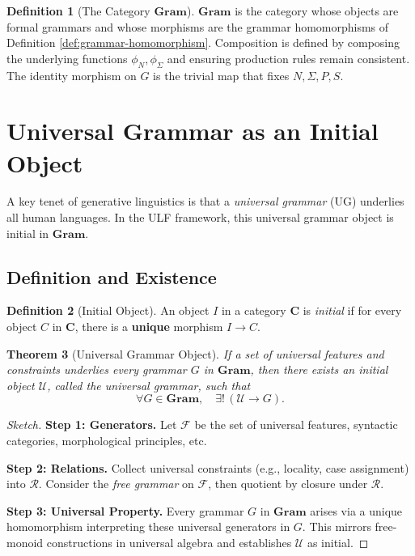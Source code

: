 \documentclass[12pt]{article}
\theoremstyle{plain}
\newtheorem{theorem}{Theorem}[section]
\theoremstyle{definition}
\newtheorem{definition}[theorem]{Definition}
\begin{document}
\begin{definition}[The Category \(\mathbf{Gram}\)]
\(\mathbf{Gram}\) is the category whose objects are formal grammars and whose morphisms are the grammar homomorphisms of Definition \ref{def:grammar-homomorphism}. Composition is defined by composing the underlying functions \(\phi_N, \phi_\Sigma\) and ensuring production rules remain consistent. The identity morphism on \(G\) is the trivial map that fixes \(N, \Sigma, P, S\).
\end{definition}

\section{Universal Grammar as an Initial Object}
A key tenet of generative linguistics is that a \emph{universal grammar} (UG) underlies all human languages. In the ULF framework, this universal grammar object is initial in \(\mathbf{Gram}\).

\subsection{Definition and Existence}
\begin{definition}[Initial Object]
An object \(I\) in a category \(\mathbf{C}\) is \emph{initial} if for every object \(C\) in \(\mathbf{C}\), there is a \textbf{unique} morphism \(I \to C\).
\end{definition}

\begin{theorem}[Universal Grammar Object]\label{thm:UG}
If a set of universal features and constraints underlies every grammar \(G\) in \(\mathbf{Gram}\), then there exists an \emph{initial object} \(\mathcal{U}\), called the \emph{universal grammar}, such that
\[
\forall G \in \mathbf{Gram}, \quad \exists!\, (\mathcal{U} \to G).
\]
\end{theorem}

\begin{proof}[Sketch]
\textbf{Step 1: Generators.}  
Let \(\mathcal{F}\) be the set of universal features, syntactic categories, morphological principles, etc.

\textbf{Step 2: Relations.}  
Collect universal constraints (e.g., locality, case assignment) into \(\mathcal{R}\). Consider the \emph{free grammar} on \(\mathcal{F}\), then quotient by closure under \(\mathcal{R}\).

\textbf{Step 3: Universal Property.}  
Every grammar \(G\) in \(\mathbf{Gram}\) arises via a unique homomorphism interpreting these universal generators in \(G\). This mirrors free-monoid constructions in universal algebra and establishes \(\mathcal{U}\) as initial.
\end{proof}
\end{document}
